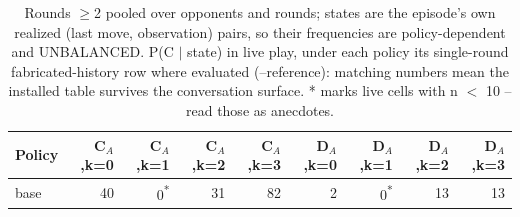 \begin{table}[t]
\centering
\caption{Rounds $\geq$2 pooled over opponents and rounds; states are the episode's own realized (last move, observation) pairs, so their frequencies are policy-dependent and UNBALANCED. P(C $\mid$ state) in live play, under each policy its single-round fabricated-history row where evaluated (--reference): matching numbers mean the installed table survives the conversation surface. * marks live cells with n $<$ 10 -- read those as anecdotes.}
\label{tab:mr-live-states}
\small
\setlength{\tabcolsep}{3.5pt}
\begin{tabular}{lrrrrrrrr}
\toprule
Policy & C$_A$,k=0 & C$_A$,k=1 & C$_A$,k=2 & C$_A$,k=3 & D$_A$,k=0 & D$_A$,k=1 & D$_A$,k=2 & D$_A$,k=3 \\
\midrule
base & 40 & 0\textsuperscript{*} & 31 & 82 & 2 & 0\textsuperscript{*} & 13 & 13 \\
\bottomrule
\end{tabular}
\end{table}

